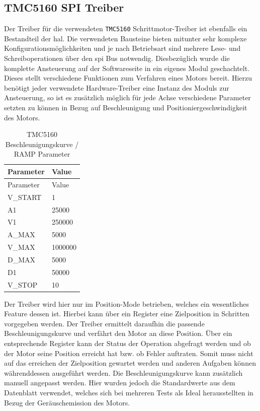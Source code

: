 \hypertarget{tmc5160-spi-treiber}{%
\subsection{TMC5160 SPI Treiber}\label{tmc5160-spi-treiber}}

Der Treiber für die verwendeten \passthrough{\lstinline!TMC5160!}
Schrittmotor-Treiber ist ebenfalls ein Bestandteil der \gls{hal}. Die
verwendeten Bausteine bieten mitunter sehr komplexe
Konfigurationsmöglichkeiten und je nach Betriebsart sind mehrere Lese-
und Schreiboperationen über den \gls{spi} Bus notwendig. Diesbezüglich
wurde die komplette Ansteuerung auf der Softwareseite in ein eigenes
Modul geschachtelt. Dieses stellt verschiedene Funktionen zum Verfahren
eines Motors bereit. Hierzu benötigt jeder verwendete Hardware-Treiber
eine Instanz des Moduls zur Ansteuerung, so ist es zusätzlich möglich
für jede Achse verschiedene Parameter setzten zu können in Bezug auf
Beschleunigung und Positioniergeschwindigkeit des Motors.

\begin{longtable}[]{@{}ll@{}}
\caption{TMC5160 Beschleunigungskurve / RAMP Parameter}\tabularnewline
\toprule
Parameter & Value\tabularnewline
\midrule
\endfirsthead
\toprule
Parameter & Value\tabularnewline
\midrule
\endhead
V\_START & 1\tabularnewline
A1 & 25000\tabularnewline
V1 & 250000\tabularnewline
A\_MAX & 5000\tabularnewline
V\_MAX & 1000000\tabularnewline
D\_MAX & 5000\tabularnewline
D1 & 50000\tabularnewline
V\_STOP & 10\tabularnewline
\bottomrule
\end{longtable}

Der Treiber wird hier nur im Position-Mode betrieben, welches ein
wesentliches Feature dessen ist. Hierbei kann über ein Register eine
Zielposition in Schritten vorgegeben werden. Der Treiber ermittelt
daraufhin die passende Beschleunigungskurve und verfährt den Motor an
diese Position. Über ein entsprechende Register kann der Status der
Operation abgefragt werden und ob der Motor seine Position erreicht hat
bzw. ob Fehler auftraten. Somit muss nicht auf das erreichen der
Zielposition gewartet werden und anderen Aufgaben können währenddessen
ausgeführt werden. Die Beschleunigungskurve kann zusätzlich manuell
angepasst werden. Hier wurden jedoch die Standardwerte aus dem
Datenblatt verwendet, welches sich bei mehreren Tests als Ideal
herausstellten in Bezug der Geräuschemission des Motors.

